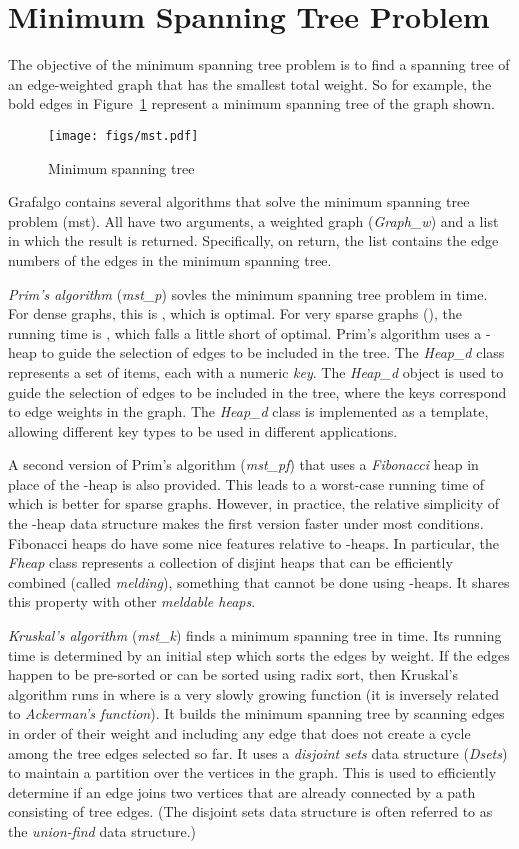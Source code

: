 \documentclass[11pt]{article}
\begin{document}
\section{Minimum Spanning Tree Problem}

The objective of the minimum spanning tree problem is to find a spanning tree
of an edge-weighted graph that has the smallest total weight. So for example, 
the bold edges in Figure~\ref{mst} represent a minimum spanning tree of
the graph shown.
\begin{figure}[h]
\centerline{\texttt{[image: figs/mst.pdf]}}
\caption{Minimum spanning tree}
\label{mst}
\end{figure}

Grafalgo contains several algorithms that solve the minimum spanning tree problem (mst).
All have two arguments, a weighted graph ({\sl Graph\_w}) and a list in which the
result is returned. Specifically, on return, the list contains the edge numbers of
the edges in the minimum spanning tree. 

{\sl Prim's algorithm} ({\sl mst\_p}) sovles the minimum spanning tree problem in
 time. For dense graphs, this is , which is
optimal. For very sparse graphs (), the running time is ,
which falls a little short of optimal.
Prim's algorithm uses a -heap to guide the selection
of edges to be included in the tree. The {\sl Heap\_d} class represents a set of items,
each with a numeric {\sl key}. The {\sl Heap\_d} object is used to guide the selection of edges to be
included in the tree, where the keys correspond to edge weights in the graph. 
The {\sl Heap\_d} class is implemented
as a template, allowing different key types to be used in different applications.

A second version of Prim's algorithm ({\sl mst\_pf}) that uses a {\sl Fibonacci} heap
in place of the -heap is also provided. This leads to a worst-case running time of 
which is better for sparse graphs. However, in practice,
the relative simplicity of the -heap data structure makes the first version faster under
most conditions. Fibonacci heaps do have some nice features relative to -heaps.
In particular, the {\sl Fheap} class represents a collection of disjint heaps that can be efficiently 
combined (called {\sl melding}),
something that cannot be done using -heaps.
It shares this property with other {\sl meldable heaps}.

{\sl Kruskal's algorithm} ({\sl mst\_k}) finds a minimum spanning tree in  time.
Its running time is determined by an initial step which sorts the edges by weight.
If the edges happen to be pre-sorted or can be sorted using radix sort, then
Kruskal's algorithm runs in  where  is a very slowly growing
function (it is inversely related to {\sl Ackerman's function}).
It builds the minimum spanning tree by scanning edges in order of their weight and including
any edge that does not create a cycle among the tree edges selected so far.
It uses a {\sl disjoint sets} data structure ({\sl Dsets}) to maintain a partition over the vertices in the graph.
This is used to efficiently determine if an edge joins two vertices that are already connected by
a path consisting of tree edges. (The disjoint sets data structure is often referred to as the
{\sl union-find} data structure.)
\end{document}
